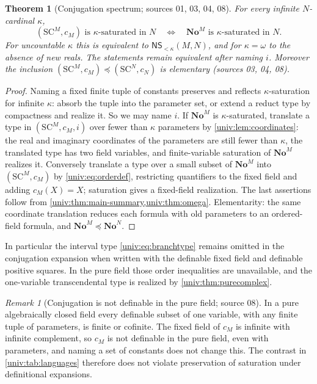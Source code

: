 \documentclass[11pt,letterpaper]{article}
\numberwithin{equation}{section}
\newtheorem{theorem}{Theorem}[section]
\theoremstyle{definition}
\theoremstyle{remark}
\newtheorem{remark}[remark]{Remark}
\newcommand{\No}{\mathbf{No}}
\newcommand{\SC}{\mathrm{SC}}
\newcommand{\NoM}{\No^{M}}
\newcommand{\NoN}{\No^{N}}
\newcommand{\SCM}{\SC^{M}}
\newcommand{\SCN}{\SC^{N}}
\newcommand{\NS}{\mathsf{NS}}
\begin{document}
\begin{theorem}[Conjugation spectrum; sources 01, 03, 04, 08]\label{univ:thm:conjugation}
For every infinite $N$-cardinal $\kappa$,
\[
 (\SCM,c_M)\text{ is }\kappa\text{-saturated in }N
 \quad\Longleftrightarrow\quad
 \NoM\text{ is }\kappa\text{-saturated in }N.
\]
For uncountable $\kappa$ this is equivalent to $\NS_{<\kappa}(M,N)$, and for
$\kappa=\omega$ to the absence of new reals. The statements remain equivalent
after naming $i$. Moreover the inclusion $(\SCM,c_M)\preccurlyeq(\SCN,c_N)$ is
elementary \textup{(sources 03, 04, 08)}.
\end{theorem}
\begin{proof}
Naming a fixed finite tuple of constants preserves and reflects
$\kappa$-saturation for infinite $\kappa$: absorb the tuple into the parameter
set, or extend a reduct type by compactness and realize it. So we may name $i$.
If $\NoM$ is $\kappa$-saturated, translate a type in $(\SCM,c_M,i)$ over fewer
than $\kappa$ parameters by \cref{univ:lem:coordinates}: the real and imaginary
coordinates of the parameters are still fewer than $\kappa$, the translated
type has two field variables, and finite-variable saturation of $\NoM$ realizes
it. Conversely translate a type over a small subset of $\NoM$ into
$(\SCM,c_M)$ by \eqref{univ:eq:orderdef}, restricting quantifiers to the fixed
field and adding $c_M(X)=X$; saturation gives a fixed-field realization. The
last assertions follow from \cref{univ:thm:main-summary,univ:thm:omega}.
Elementarity: the same coordinate translation reduces each formula with old
parameters to an ordered-field formula, and $\NoM\preccurlyeq\NoN$.
\end{proof}

In particular the interval type \eqref{univ:eq:branchtype} remains omitted in
the conjugation expansion when written with the definable fixed field and
definable positive squares. In the pure field those order inequalities are
unavailable, and the one-variable transcendental type is realized by
\cref{univ:thm:purecomplex}.

\begin{remark}[Conjugation is not definable in the pure field; source 08]\label{univ:rem:notdefinable}
In a pure algebraically closed field every definable subset of one variable,
with any finite tuple of parameters, is finite or cofinite. The fixed field of
$c_M$ is infinite with infinite complement, so $c_M$ is not definable in the
pure field, even with parameters, and naming a set of constants does not
change this. The contrast in \cref{univ:tab:languages} therefore does not
violate preservation of saturation under definitional expansions.
\end{remark}
\end{document}

